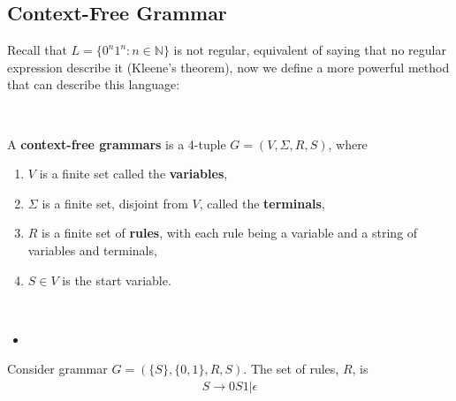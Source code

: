 \subsection{Context-Free Grammar} \label{sec:}
Recall that $L = \{ 0^{n}1^{n} : n \in \mathbb{N} \}$ is not regular, equivalent of saying that no regular expression describe it (Kleene's theorem), now we define a more powerful method that can describe this language:
\begin{definition} ~

A \textbf{context-free grammars} is a 4-tuple $G = (V, \Sigma, R, S)$, where
\begin{enumerate}
    \item $V$ is a finite set called the \textbf{variables},
    \item $\Sigma$ is a finite set, disjoint from $V$, called the \textbf{terminals},
    \item $R$ is a finite set of \textbf{rules}, with each rule being a variable and a string of variables and terminals,
    \item $S \in V$ is the start variable.
\end{enumerate}
\end{definition}


\begin{definition}[Rule] ~
    \begin{itemize}
        \item 
    \end{itemize}
\end{definition}


\begin{eg}
Consider grammar $G = (\{ S \}, \{ 0, 1 \}, R, S)$. The set of rules, $R$, is
\begin{align*}
    S \to 0S1 | \epsilon
\end{align*}
\end{eg}




